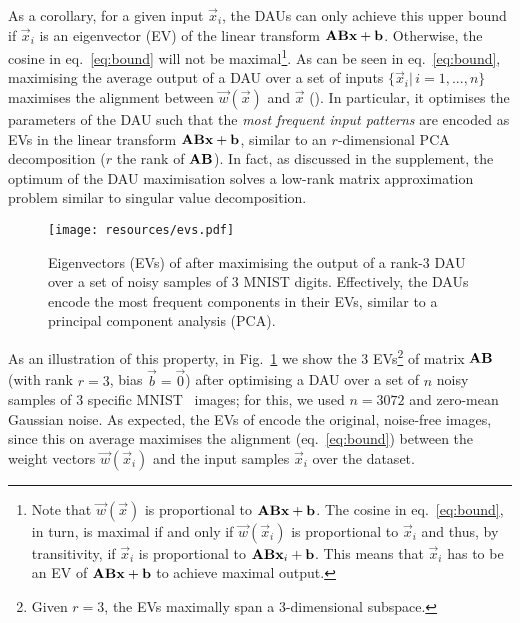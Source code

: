 As a corollary, for a given input $\vec x_i$, the DAUs can only achieve this upper bound if $\vec x_i$ is an eigenvector (EV) of the linear transform $\mat{AB}\vec x+ \vec b$. Otherwise, the cosine in eq.~\eqref{eq:bound} will not be maximal\footnote{
Note that $\vec w(\vec x)$ is proportional to $\mat{ab}\vec x + \vec b$. The cosine in eq.~\eqref{eq:bound}, in turn, is maximal if and only if $\vec w(\vec x_i)$ is proportional to $\vec x_i$ and thus, by transitivity, if $\vec x_i$ is proportional to $\mat{ab}\vec x_i + \vec b$. This means that $\vec x_i$ has to be an EV of $\mat{ab}\vec x +\vec b$ to achieve maximal output.}. 
As can be seen in eq.~\eqref{eq:bound}, maximising the average output of a DAU over a set of inputs $\{\vec x_i|\,i=1, ..., n\}$
maximises the alignment between $\vec w(\vec x)$ and $\vec x$ ().
In particular, it optimises the parameters of the DAU such that the \emph{most frequent input patterns} are encoded as EVs in the linear transform $\mat{ab}\vec x + \vec b$, similar to an $r$-dimensional PCA decomposition ($r$ the rank of $\mat{ab}$). In fact, as discussed in the supplement, the optimum of the DAU maximisation solves a low-rank matrix approximation~\cite{eckart1936approximation} problem similar to singular value decomposition.
\begin{figure}[t!]
    \centering
    \texttt{[image: resources/evs.pdf]}
    \caption{\small Eigenvectors (EVs) of  after maximising the output of a rank-3 DAU over a set of noisy samples of 3 MNIST digits. Effectively, the DAUs encode the most frequent components in their EVs, similar to a principal component analysis (PCA).
    }
    \label{fig:EVs}
\end{figure}
%
As an illustration of this property, in Fig.~\ref{fig:EVs} we show the 3 EVs\footnote{Given $r=3$, the EVs maximally span a 3-dimensional subspace.} of matrix $\mat{ab}$ (with rank $r=3$, bias $\vec b=\vec 0$) after optimising a DAU over a set of $n$ noisy samples of 3 specific MNIST~\cite{lecun2010mnist} images; for this, we used $n=3072$ and zero-mean Gaussian noise. As expected, the EVs of  encode the original, noise-free images, since this on average maximises the alignment (eq.~\eqref{eq:bound}) between the weight vectors $\vec w(\vec x_i)$ and the input samples $\vec x_i$ over the dataset.
%
%

